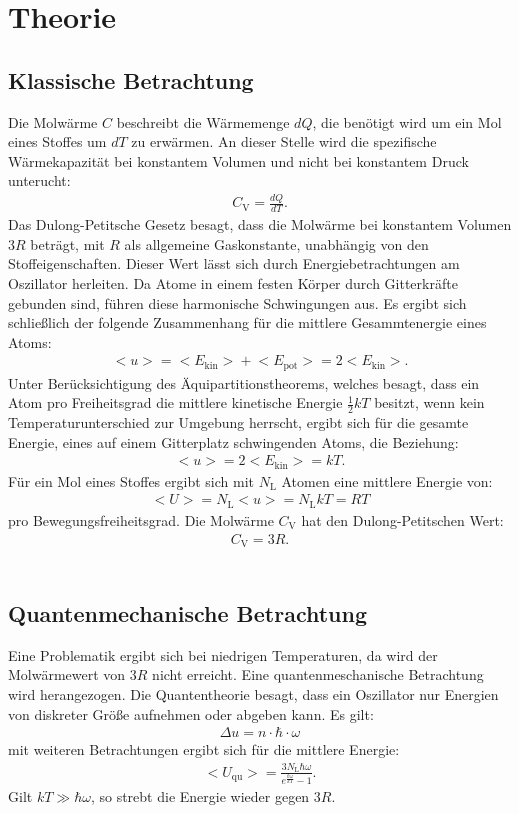 \section{Theorie}
\label{sec:Theorie}
\subsection{Klassische Betrachtung}
Die Molwärme $C$ beschreibt die Wärmemenge $dQ$,
die benötigt wird um ein Mol eines Stoffes um $dT$ zu erwärmen.
An dieser Stelle wird die spezifische Wärmekapazität bei konstantem Volumen und nicht bei
konstantem Druck unterucht:
\begin{align}
  C_{\mathrm{V}}=\frac{dQ}{dT}.
\end{align}
Das Dulong-Petitsche Gesetz besagt, dass die Molwärme bei konstantem Volumen
$3R$ beträgt, mit $R$ als allgemeine Gaskonstante, unabhängig von den Stoffeigenschaften.
Dieser Wert lässt sich durch Energiebetrachtungen am Oszillator herleiten. Da Atome in einem
festen Körper durch Gitterkräfte gebunden sind, führen diese harmonische Schwingungen
aus. Es ergibt sich schließlich der folgende Zusammenhang für die mittlere Gesammtenergie
eines Atoms:
\begin{align}
  \bigl<u\bigr>=\bigl<E_{\mathrm{kin}}\bigr>+\bigl<E_{\mathrm{pot}}\bigr>=2\bigl<E_{\mathrm{kin}}\bigr>.
\end{align}
Unter Berücksichtigung des Äquipartitionstheorems, welches besagt, dass ein Atom
pro Freiheitsgrad die mittlere kinetische Energie $\frac{1}{2}kT$ besitzt,
wenn kein Temperaturunterschied zur Umgebung herrscht, ergibt sich für
die gesamte Energie, eines auf einem Gitterplatz schwingenden Atoms, die Beziehung:
\begin{align}
  \bigl<u\bigr>=2\bigl<E_{\mathrm{kin}}\bigr>=kT.
\end{align}
Für ein Mol eines Stoffes ergibt sich mit $N_\mathrm{L}$ Atomen eine mittlere Energie von:
\begin{align}
  \bigl<U\bigr>=N_{\mathrm{L}}\bigl<u\bigr>=N_{\mathrm{L}}kT=RT
\end{align}
pro Bewegungsfreiheitsgrad.
Die Molwärme $C_{\mathrm{V}}$ hat den Dulong-Petitschen Wert:
\begin{align}
  C_{\mathrm{V}}=3R.
\end{align}\\
\subsection{Quantenmechanische Betrachtung}
Eine Problematik ergibt sich bei niedrigen Temperaturen, da wird der Molwärmewert
von $3R$ nicht erreicht. Eine quantenmeschanische Betrachtung wird herangezogen.
Die Quantentheorie besagt, dass ein Oszillator nur Energien von diskreter Größe
aufnehmen oder abgeben kann.
Es gilt:
\begin{align}
  \Delta u=n\cdot\hbar\cdot\omega
\end{align}
mit weiteren Betrachtungen ergibt sich für die mittlere Energie:
\begin{align}
\bigl<U_{\mathrm{qu}}\bigr>=\frac{3N_{\mathrm{L}}\hbar\omega}{e^{\frac{\hbar\omega}{kT}}-1}.
\end{align}
Gilt $kT \gg \hbar\omega$, so strebt die Energie wieder gegen $3R$.

